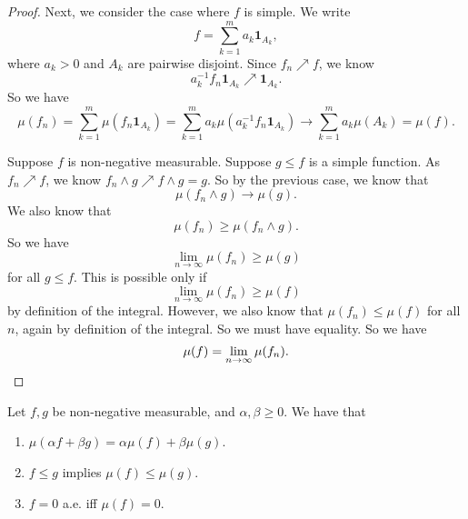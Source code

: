 \documentclass[a4paper]{article}
\begin{document}
\begin{proof}
  Next, we consider the case where $f$ is simple. We write
  \[
    f = \sum_{k = 1}^m a_k \mathbf{1}_{A_k},
  \]
  where $a_k > 0$ and $A_k$ are pairwise disjoint. Since $f_n \nearrow f$, we know
  \[
    a_k^{-1} f_n \mathbf{1}_{A_k} \nearrow \mathbf{1}_{A_k}.
  \]
  So we have
  \[
    \mu(f_n) = \sum_{k = 1}^m \mu(f_n \mathbf{1}_{A_k}) = \sum_{k = 1}^m a_k \mu(a_k^{-1} f_n \mathbf{1}_{A_k}) \to \sum_{k = 1}^m a_k \mu(A_k) = \mu(f).
  \]

  \separator

  Suppose $f$ is non-negative measurable. Suppose $g \leq f$ is a simple function. As $f_n \nearrow f$, we know $f_n \wedge g \nearrow f \wedge g = g$. So by the previous case, we know that
  \[
    \mu(f_n \wedge g) \to \mu(g).
  \]
  We also know that
  \[
    \mu(f_n) \geq \mu(f_n\wedge g).
  \]
  So we have
  \[
    \lim_{n \to \infty} \mu(f_n) \geq \mu(g)
  \]
  for all $g \leq f$. This is possible only if
  \[
    \lim_{n \to \infty} \mu(f_n) \geq \mu(f)
  \]
  by definition of the integral. However, we also know that $\mu(f_n) \leq \mu(f)$ for all $n$, again by definition of the integral. So we must have equality. So we have
  \[
    \mu(f) = \lim_{n \to \infty} \mu(f_n).\qedhere
  \]
\end{proof}

\begin{thm}
  Let $f, g$ be non-negative measurable, and $\alpha, \beta \geq 0$. We have that
  \begin{enumerate}
    \item $\mu(\alpha f + \beta g) = \alpha \mu(f) + \beta \mu(g)$.
    \item $f \leq g$ implies $\mu(f) \leq \mu(g)$.
    \item $f = 0$ a.e. iff $\mu(f) = 0$.
  \end{enumerate}
\end{thm}
\end{document}
